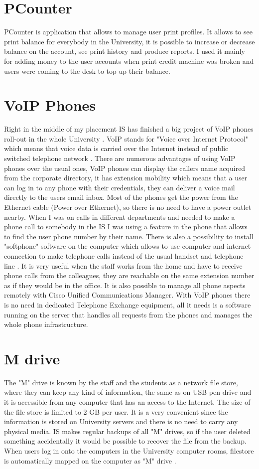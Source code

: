 \documentclass[10pt,a4paper,headinclude=true]{report}
\begin{document}
\section{PCounter}
PCounter is application that allows to  manage user print profiles. It allows to see print balance for everybody in the University, it is possible to increase or decrease balance on the account, see print history and produce reports. I used it mainly for adding money to the user accounts when print credit machine was broken and users were coming to the desk to top up their balance.

\section{VoIP Phones}
Right in the middle of my placement IS has finished a big project of VoIP phones roll-out in the whole University \cite{VoIP}. VoIP stands for "Voice over Internet Protocol" which means that voice data is carried over the Internet instead of public switched telephone network \cite{VoIP2}. There are numerous advantages of using VoIP phones over the usual ones, VoIP phones can display the callers name acquired from the corporate directory, it has extension mobility which means that a user can log in to any phone with their credentials, they can deliver a voice mail directly to the users email inbox. Most of the phones get the power from the Ethernet cable (Power over Ethernet), so there is no need to have a power outlet nearby. When I was on calls in different departments and needed to make a phone call to somebody in the IS I was using a feature in the phone that allows to find the user phone number by their name. There is also a possibility to install "softphone" software on the computer which allows to use computer and internet connection to make telephone calls instead of the usual handset and telephone line \cite{VoIP3}. It is very useful when the staff works from the home and have to receive phone calls from the colleagues, they are reachable on the same extension number as if they would be in the office. It is also possible to manage all phone aspects remotely with Cisco Unified Communications Manager. With VoIP phones there is no need in dedicated Telephone Exchange equipment, all it needs is a software running on the server that handles all requests from the phones and manages the whole phone infrastructure.
 
\section{M drive}
The "M" drive is known by the staff and the students as a network file store, where they can keep any kind of information, the same as on USB pen drive and it is accessible from any computer that has an access to the Internet. The size of the file store is limited to 2 GB per user.  It is a very convenient since the information is stored on University servers and there is no need to carry any physical media. IS makes regular backups of all "M" drives, so if the user deleted something accidentally it would be possible to recover the file from the backup. When users log in onto the computers in the University computer rooms, filestore is automatically mapped on the computer as "M" drive \cite{MDrive}.
\end{document}
